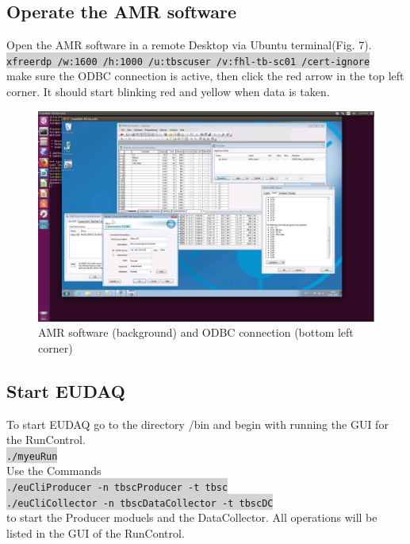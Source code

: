 \documentclass[a4paper,12pt]{scrartcl}
\begin{document}
\subsection{Operate the AMR software}
Open the AMR software in a remote Desktop via Ubuntu terminal(Fig. 7). \\
\colorbox{lightgray}{\texttt{xfreerdp /w:1600 /h:1000 /u:tbscuser /v:fhl-tb-sc01 /cert-ignore}} \\
make sure the ODBC connection is active, then click the red arrow in the top left corner. It should start blinking red and yellow when data is taken.

\begin{figure} [H]
\centering
\includegraphics[trim={5cm 5cm 7cm 2cm},clip,width=\textwidth]{AMRSoftware.png}
\caption{AMR software (background) and ODBC connection (bottom left corner)}
\end{figure}

\subsection{Start EUDAQ}
To start EUDAQ go to the directory /bin and begin with running the GUI for the RunControl.\\
\colorbox{lightgray}{\texttt{./myeuRun}} \\
Use the Commands \\
\colorbox{lightgray}{\texttt{./euCliProducer -n tbscProducer -t tbsc}} \\
\colorbox{lightgray}{\texttt{./euCliCollector -n tbscDataCollector -t tbscDC}} \\
to start the Producer moduels and the DataCollector. All operations will be listed in the GUI of the RunControl.
\end{document}
